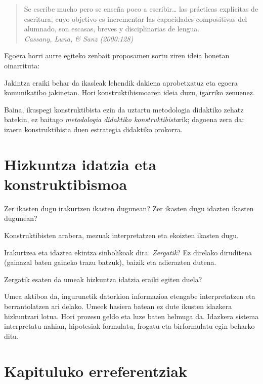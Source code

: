 \documentclass[]{book}
\begin{document}
\begin{quote}
Se escribe mucho pero se enseña poco a escribir\ldots{} las prácticas explícitas de escritura, cuyo objetivo es incrementar las capacidades compositivas del alumnado, son escasas, breves y disciplinarias de lengua.\\
\emph{Cassany, Luna, \& Sanz (2000:128)}
\end{quote}

Egoera horri aurre egiteko zenbait proposamen sortu ziren ideia honetan oinarrituta:

Jakintza eraiki behar da ikasleak lehendik dakiena aprobetxatuz eta egoera komunikatibo jakinetan. Hori konstruktibismoaren ideia duzu, igarriko zenuenez.

Baina, ikuspegi konstruktibista ezin da uztartu metodologia didaktiko zehatz batekin, ez baitago \emph{metodologia didaktiko konstruktibista}rik; dagoena zera da: izaera konstruktibista duen estrategia didaktiko orokorra.

\hypertarget{hizkuntza-idatzia-eta-konstruktibismoa}{%
\section{Hizkuntza idatzia eta konstruktibismoa}\label{hizkuntza-idatzia-eta-konstruktibismoa}}

Zer ikasten dugu irakurtzen ikasten dugunean? Zer ikasten dugu idazten ikasten dugunean?

Konstruktibisten arabera, mezuak interpretatzen eta ekoizten ikasten dugu.

Irakurtzea eta idaztea ekintza sinbolikoak dira. \emph{Zergatik}? Ez direlako diruditena (gainazal baten gaineko trazu batzuk), baizik eta adierazten dutena.

Zergatik esaten da umeak hizkuntza idatzia eraiki egiten duela?

Umea aktiboa da, ingurunetik datorkion informazioa etengabe
interpretatzen eta berrantolatzen ari delako. Umeek hasiera batean ez dute ikusten idazkera hizkuntzari lotua. Hori prozesu geldo eta luze baten helmuga da.
Idazkera sistema interpretatu nahian, hipotesiak formulatu, frogatu eta birformulatu egin beharko ditu.

\hypertarget{kapituluko-erreferentziak-1}{%
\section{Kapituluko erreferentziak}\label{kapituluko-erreferentziak-1}}
\end{document}
